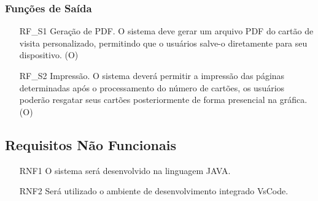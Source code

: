 \subsubsection{Funções de Saída}
\begin{itemize}
    \item[RF\_S1] Geração de PDF. O sistema deve gerar um arquivo PDF do cartão de visita personalizado, permitindo que o usuários salve-o diretamente para seu dispositivo. (O)
    \item[RF\_S2] Impressão. O sistema deverá permitir a impressão das páginas determinadas após o processamento do número de cartões, os usuários poderão resgatar seus cartões posteriormente de forma presencial na gráfica. (O)
\end{itemize}

\subsection{Requisitos Não Funcionais}
\begin{itemize}
    \item[RNF1] O sistema será desenvolvido na linguagem JAVA.
    \item[RNF2] Será utilizado o ambiente de desenvolvimento integrado VsCode.
\end{itemize}

